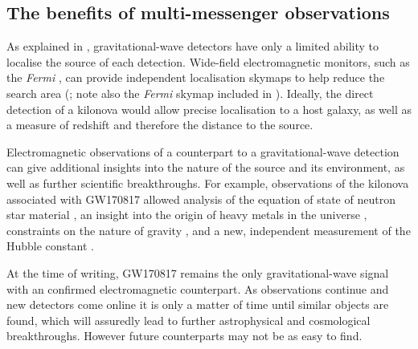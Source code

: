 \subsection{The benefits of multi-messenger observations}
\label{sec:mma_benefits}
\begin{colsection}

As explained in , gravitational-wave detectors have only a limited ability to localise the source of each detection. Wide-field electromagnetic monitors, such as the \textit{Fermi} , can provide independent localisation skymaps to help reduce the search area (\cite{GW170817_GRB}; note also the \textit{Fermi} skymap included in ). Ideally, the direct detection of a kilonova would allow precise localisation to a host galaxy, as well as a measure of redshift and therefore the distance to the source.

Electromagnetic observations of a counterpart to a gravitational-wave detection can give additional insights into the nature of the source and its environment, as well as further scientific breakthroughs. For example, observations of the kilonova associated with GW170817 \citep{GW170817, GW170817_followup} allowed analysis of the equation of state of neutron star material \citep{GW170817_NSscience}, an insight into the origin of heavy metals in the universe \citep{GW170818_heavy}, constraints on the nature of gravity \citep{GW170817_gravity}, and a new, independent measurement of the Hubble constant \citep{GW170817_hubble}.

At the time of writing, GW170817 remains the only gravitational-wave signal with an confirmed electromagnetic counterpart. As observations continue and new detectors come online it is only a matter of time until similar objects are found, which will assuredly lead to further astrophysical and cosmological breakthroughs. However future counterparts may not be as easy to find.

\end{colsection}


